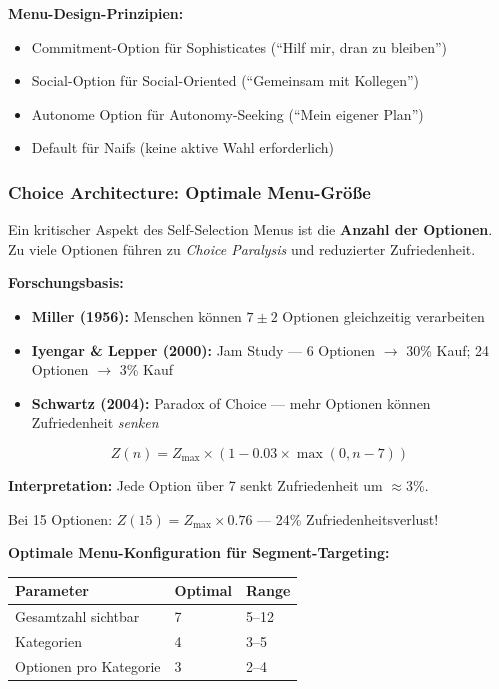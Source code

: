 \textbf{Menu-Design-Prinzipien:}
\begin{itemize}
\item Commitment-Option für Sophisticates (``Hilf mir, dran zu bleiben'')
\item Social-Option für Social-Oriented (``Gemeinsam mit Kollegen'')
\item Autonome Option für Autonomy-Seeking (``Mein eigener Plan'')
\item Default für Naifs (keine aktive Wahl erforderlich)
\end{itemize}

\subsubsection{Choice Architecture: Optimale Menu-Größe}

Ein kritischer Aspekt des Self-Selection Menus ist die \textbf{Anzahl der Optionen}. Zu viele Optionen führen zu \textit{Choice Paralysis} und reduzierter Zufriedenheit.

\textbf{Forschungsbasis:}
\begin{itemize}[nosep]
\item \textbf{Miller (1956):} Menschen können $7 \pm 2$ Optionen gleichzeitig verarbeiten
\item \textbf{Iyengar \& Lepper (2000):} Jam Study --- 6 Optionen $\rightarrow$ 30\% Kauf; 24 Optionen $\rightarrow$ 3\% Kauf
\item \textbf{Schwartz (2004):} Paradox of Choice --- mehr Optionen können Zufriedenheit \textit{senken}
\end{itemize}

\begin{tcolorbox}[colback=yellow!5!white, colframe=yellow!75!black,
    title=Zufriedenheits-Formel für Choice Menus]
\begin{equation}
Z(n) = Z_{\max} \times (1 - 0.03 \times \max(0, n-7))
\label{eq:19-choice-satisfaction}
\end{equation}

\textbf{Interpretation:} Jede Option über 7 senkt Zufriedenheit um $\approx 3\%$.

Bei 15 Optionen: $Z(15) = Z_{\max} \times 0.76$ --- 24\% Zufriedenheitsverlust!
\end{tcolorbox}

\textbf{Optimale Menu-Konfiguration für Segment-Targeting:}

\begin{center}
\begin{tabular}{@{}lll@{}}
\toprule
\textbf{Parameter} & \textbf{Optimal} & \textbf{Range} \\
\midrule
Gesamtzahl sichtbar & 7 & 5--12 \\
Kategorien & 4 & 3--5 \\
Optionen pro Kategorie & 3 & 2--4 \\
\bottomrule
\end{tabular}
\end{center}

